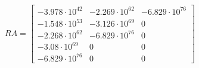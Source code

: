 \begin{equation}
RA = \left[\begin{matrix}-3.978 \cdot 10^{42} & -2.269 \cdot 10^{62} & -6.829 \cdot 10^{76}\\-1.548 \cdot 10^{53} & -3.126 \cdot 10^{69} & 0\\-2.268 \cdot 10^{62} & -6.829 \cdot 10^{76} & 0\\-3.08 \cdot 10^{69} & 0 & 0\\-6.829 \cdot 10^{76} & 0 & 0\end{matrix}\right]
\end{equation}

